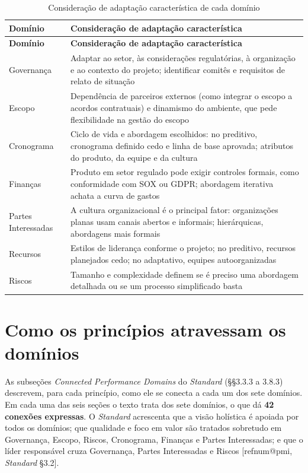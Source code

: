 \documentclass[11pt,a4paper]{article}
\makeatletter
\newcommand{\refnum}[1]{\csname refnum@#1\endcsname}
\newcommand{\cit}[1]{[\refnum{#1}]}
\newcommand{\SingleSpacing}{}
\newcommand{\fontetab}[1]{\par\vspace{3pt}{\small\noindent Fonte: #1\par}}
\makeatother
\begin{document}
\begingroup\SingleSpacing\small
\begin{longtable}{@{}>{\raggedright\arraybackslash}p{}>{\raggedright\arraybackslash}p{}@{}}
\caption{Consideração de adaptação característica de cada domínio}\label{tab:t9}\\
\toprule
\textbf{Domínio} & \textbf{Consideração de adaptação característica}\\
\midrule
\endfirsthead
\toprule
\textbf{Domínio} & \textbf{Consideração de adaptação característica}\\
\midrule
\endhead
\bottomrule
\endfoot
\bottomrule
\endlastfoot
Governança & Adaptar ao setor, às considerações regulatórias, à organização e ao contexto do projeto; identificar comitês e requisitos de relato de situação\\[3pt]
Escopo & Dependência de parceiros externos (como integrar o escopo a acordos contratuais) e dinamismo do ambiente, que pede flexibilidade na gestão do escopo\\[3pt]
Cronograma & Ciclo de vida e abordagem escolhidos: no preditivo, cronograma definido cedo e linha de base aprovada; atributos do produto, da equipe e da cultura\\[3pt]
Finanças & Produto em setor regulado pode exigir controles formais, como conformidade com SOX ou GDPR; abordagem iterativa achata a curva de gastos\\[3pt]
Partes Interessadas & A cultura organizacional é o principal fator: organizações planas usam canais abertos e informais; hierárquicas, abordagens mais formais\\[3pt]
Recursos & Estilos de liderança conforme o projeto; no preditivo, recursos planejados cedo; no adaptativo, equipes autoorganizadas\\[3pt]
Riscos & Tamanho e complexidade definem se é preciso uma abordagem detalhada ou se um processo simplificado basta\\[3pt]
\end{longtable}
\endgroup
\fontetab{Elaborado pelos autores (2026), com base em \cit{pmi}.}

\section{Como os princípios atravessam os domínios}

As subseções \textit{Connected Performance Domains} do \textit{Standard} (§§3.3.3 a 3.8.3) descrevem, para cada princípio, como ele se conecta a cada um dos sete domínios. Em cada uma das seis seções o texto trata dos sete domínios, o que dá \textbf{42 conexões expressas}. O \textit{Standard} acrescenta que a visão holística é apoiada por todos os domínios; que qualidade e foco em valor são tratados sobretudo em Governança, Escopo, Riscos, Cronograma, Finanças e Partes Interessadas; e que o líder responsável cruza Governança, Partes Interessadas e Riscos [\refnum{pmi}, \textit{Standard} §3.2].
\end{document}
